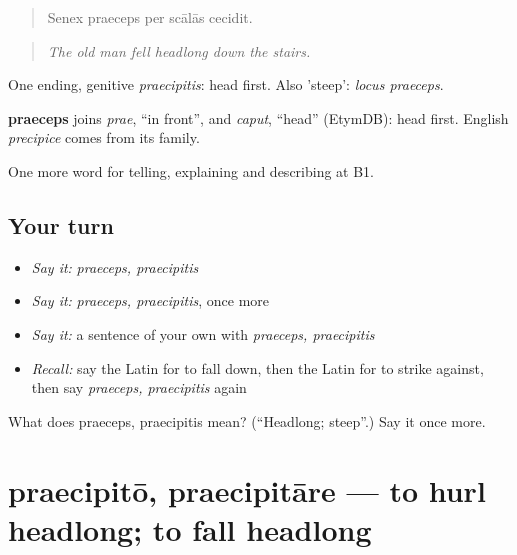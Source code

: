 \begin{quote}
Senex praeceps per scālās cecidit.
\end{quote}

\begin{quote}
\emph{The old man fell headlong down the stairs.}
\end{quote}

One ending, genitive \emph{praecipitis}: head first. Also 'steep': \emph{locus praeceps}.

\begin{cousinweb}
\textbf{praeceps} joins \emph{prae}, \textquotedblleft{}in front\textquotedblright{}, and \emph{caput}, \textquotedblleft{}head\textquotedblright{} (EtymDB): head first. English \emph{precipice} comes from its family.
\end{cousinweb}

\begin{grammarlens}[title={What you've built}]
One more word for telling, explaining and describing at B1.
\end{grammarlens}

\subsection*{Your turn}
\begin{itemize}
\raggedright
  \item \emph{Say it:} \emph{praeceps, praecipitis}
  \item \emph{Say it:} \emph{praeceps, praecipitis}, once more
  \item \emph{Say it:} a sentence of your own with \emph{praeceps, praecipitis}
  \item \emph{Recall:} say the Latin for to fall down, then the Latin for to strike against, then say \emph{praeceps, praecipitis} again
\end{itemize}

\begin{tcolorbox}[breakable,colback=teal!4,colframe=teal!35!black,title={Before you move on}]
What does praeceps, praecipitis mean? (\textquotedblleft{}Headlong; steep\textquotedblright{}.) Say it once more.
\end{tcolorbox}
\section[praecipitō, praecipitāre]{praecipitō, praecipitāre — to hurl headlong; to fall headlong}

\label{lesson:LA-C314-praecipito}



